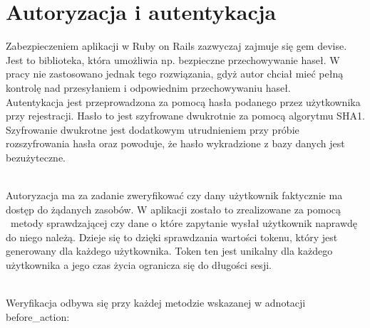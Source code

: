 
\section{Autoryzacja i autentykacja}
\label{sec:autoryzacjaAutentykacja}
Zabezpieczeniem aplikacji w Ruby on Rails zazwyczaj zajmuje się gem devise. Jest to biblioteka, która umożliwia np. bezpieczne przechowywanie haseł\cite{rails}. W pracy nie zastosowano jednak tego rozwiązania, gdyż autor chciał mieć pełną  kontrolę nad przesyłaniem i odpowiednim przechowywaniu haseł.\\
Autentykacja jest przeprowadzona za pomocą hasła podanego przez użytkownika przy rejestracji. Hasło to jest szyfrowane dwukrotnie za pomocą algorytmu SHA1. Szyfrowanie dwukrotne jest dodatkowym utrudnieniem przy próbie rozszyfrowania hasła oraz powoduje, że hasło wykradzione z bazy danych jest bezużyteczne.\\
\begin{minipage}{\linewidth}
\label{encryptpassword}
\end{minipage}\\
Autoryzacja ma za zadanie zweryfikować czy dany użytkownik faktycznie ma dostęp do żądanych zasobów. W aplikacji zostało to zrealizowane za pomocą  metody sprawdzającej czy dane o które zapytanie wysłał użytkownik naprawdę do niego należą. Dzieje się to dzięki sprawdzania wartości tokenu, który jest generowany dla każdego użytkownika. Token ten jest unikalny dla każdego użytkownika a jego czas życia ogranicza się do długości sesji. 
\begin{minipage}{\linewidth}
\label{authorization}
\end{minipage}\\
Weryfikacja odbywa się przy każdej metodzie wskazanej w adnotacji before\_action:\\
\begin{minipage}{\linewidth}
\label{before_authorization}
\end{minipage}
